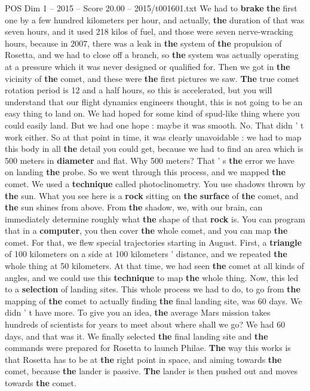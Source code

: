 \begin{textsample}{POS Dim 1 – 2015 – Score 20.00 – 2015/t001601.txt}
We had to \textbf{brake} \textbf{the} first one by a few hundred kilometers per hour, and actually, \textbf{the} duration of that was seven hours, and it used 218 kilos of fuel, and those were seven nerve-wracking hours, because in 2007, there was a leak in \textbf{the} system of \textbf{the} propulsion of Rosetta, and we had to close off a branch, so \textbf{the} system was actually operating at a pressure which it was never designed or qualified for.
Then we got in \textbf{the} vicinity of \textbf{the} comet, and these were \textbf{the} first pictures we saw. \textbf{The} true comet rotation period is 12 and a half hours, so this is accelerated, but you will understand that our flight dynamics engineers thought, this is not going to be an easy thing to land on.
We had hoped for some kind of spud-like thing where you could easily land.
But we had one hope : maybe it was smooth.
No.
That didn ' t work either.
So at that point in time, it was clearly unavoidable : we had to map this body in all \textbf{the} detail you could get, because we had to find an area which is 500 meters in \textbf{diameter} and flat.
Why 500 meters?
That ' s \textbf{the} error we have on landing \textbf{the} probe.
So we went through this process, and we mapped \textbf{the} comet.
We used a \textbf{technique} called photoclinometry.
You use shadows thrown by \textbf{the} sun.
What you see here is a \textbf{rock} sitting on \textbf{the} \textbf{surface} of \textbf{the} comet, and \textbf{the} sun shines from above.
From \textbf{the} shadow, we, with our brain, can immediately determine roughly what \textbf{the} shape of that \textbf{rock} is.
You can program that in a \textbf{computer}, you then cover \textbf{the} whole comet, and you can map \textbf{the} comet.
For that, we flew special trajectories starting in August.
First, a \textbf{triangle} of 100 kilometers on a side at 100 kilometers ' distance, and we repeated \textbf{the} whole thing at 50 kilometers.
At that time, we had seen \textbf{the} comet at all kinds of angles, and we could use this \textbf{technique} to map \textbf{the} whole thing.
Now, this led to a \textbf{selection} of landing sites.
This whole process we had to do, to go from \textbf{the} mapping of \textbf{the} comet to actually finding \textbf{the} final landing site, was 60 days.
We didn ' t have more.
To give you an idea, \textbf{the} average Mars mission takes hundreds of scientists for years to meet about where shall we go?
We had 60 days, and that was it.
We finally selected \textbf{the} final landing site and \textbf{the} commands were prepared for Rosetta to launch Philae. \textbf{The} way this works is that Rosetta has to be at \textbf{the} right point in space, and aiming towards \textbf{the} comet, because \textbf{the} lander is passive. \textbf{The} lander is then pushed out and moves towards \textbf{the} comet.

\end{textsample}

